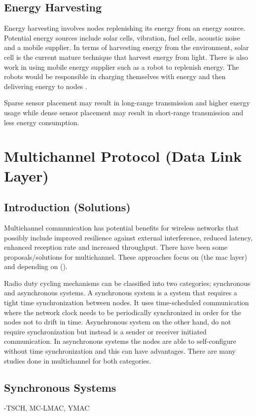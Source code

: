 \subsection{Energy Harvesting}
Energy harvesting involves nodes replenishing its energy from an energy source. Potential energy sources include solar cells, vibration, fuel cells, acoustic noise and a mobile supplier. In terms of harvesting energy from the environment, solar cell is the current mature technique that harvest energy from light. There is also work in using mobile energy supplier such as a robot to replenish energy. The robots would be responsible in charging themselves with energy and then delivering energy to nodes \cite{wsnSurvey1}.

Sparse sensor placement may result in long-range transmission and higher energy usage while dense sensor placement may result in short-range transmission and less energy consumption.

\section{Multichannel Protocol (Data Link Layer)}
\subsection{Introduction (Solutions)}
Multichannel communication has potential benefits for wireless networks that possibly include improved resilience against external interference, reduced latency, enhanced reception rate and increased throughput. 
There have been some proposals/solutions for multichannel. These approaches focus on (the mac layer) and depending on ().

Radio duty cycling mechanisms can be classified into two categories; synchronous and asynchronous systems. A synchronous system is a system that requires a tight time synchronization between nodes. It uses time-scheduled communication where the network clock needs to be periodically synchronized in order for the nodes not to drift in time. Asynchronous system on the other hand, do not require synchronization but instead is a sender or receiver initiated communication. In asynchronous systems the nodes are able to self-configure without time synchronization and this can have advantages. There are many studies done in multichannel for both categories.

\subsection{Synchronous Systems}
-TSCH, MC-LMAC, YMAC

